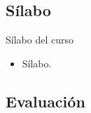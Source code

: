 \documentclass[10pt]{beamer}
\newcommand{\1}{
        	\setbeamertemplate{background}{
        		\texttt{[image: img/1]}
        		\tikz[overlay] \fill[fill opacity=0.75,fill=white] (0,0) rectangle (-\paperwidth,\paperheight);
        	}
}
\begin{document}
\subsection{Sílabo}

\begin{frame}{Sílabo del curso}{}	
	\begin{itemize}
		\item Sílabo.
	\end{itemize}
\end{frame}

\subsection{Evaluación}
\end{document}
